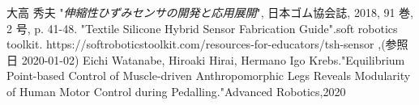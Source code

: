 \pagebreak

\begin{thebibliography}{99}


大高 秀夫 "{\it 伸縮性ひずみセンサの開発と応用展開}", 日本ゴム協会誌, 2018, 91 巻, 2 号, p. 41-48.
 "Textile Silicone Hybrid Sensor Fabrication \newline Guide".soft robotics toolkit. \newline https://softroboticstoolkit.com/resources-for-educators/tsh-sensor ,(参照日 2020-01-02)
 Eichi Watanabe, Hiroaki Hirai, Hermano Igo Krebs."Equilibrium Point-based Control of Muscle-driven Anthropomorphic Legs Reveals Modularity of Human Motor Control during Pedalling."Advanced Robotics,2020

\end{thebibliography}